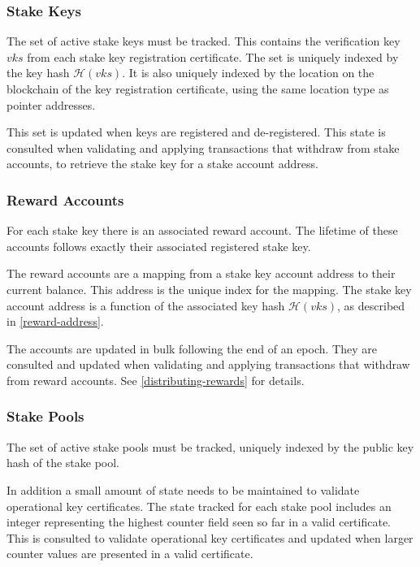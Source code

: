 \documentclass[11pt,a4paper]{article}
\begin{document}
\subsubsection{Stake Keys}
\label{stake-keys}

The set of active stake keys must be tracked. This contains the
verification key \(vks\) from each stake key registration certificate.
The set is uniquely indexed by the key hash \(\mathcal{H}(vks)\). It is
also uniquely indexed by the location on the blockchain of the key
registration certificate, using the same location type as pointer
addresses.

This set is updated when keys are registered and de-registered. This
state is consulted when validating and applying transactions that
withdraw from stake accounts, to retrieve the stake key for a stake
account address.

\subsubsection{Reward Accounts}
\label{reward-accounts}

For each stake key there is an associated reward account. The lifetime of
these accounts follows exactly their associated registered stake key.

The reward accounts are a mapping from a stake key account address to
their current balance. This address is the unique index for the mapping.
The stake key account address is a function of the associated key hash
\(\mathcal{H}(vks)\), as described in \cref{reward-address}.

The accounts are updated in bulk following the end of an epoch. They are
consulted and updated when validating and applying transactions that
withdraw from reward accounts. See \cref{distributing-rewards} for
details.

\subsubsection{Stake Pools}
\label{stake-pools}

The set of active stake pools must be tracked, uniquely indexed
by the public key hash of the stake pool.

In addition a small amount of state needs to be maintained to validate
operational key certificates. The state tracked for each stake pool includes
an integer representing the highest counter field seen so far in a valid
certificate. This is consulted to validate operational key certificates and
updated when larger counter values are presented in a valid certificate.
\end{document}
